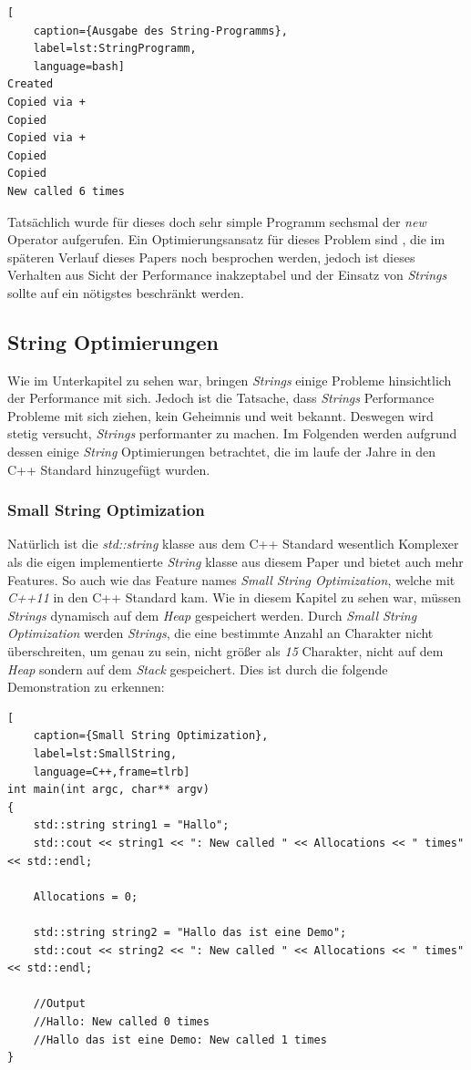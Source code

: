 \begin{lstlisting}[
    caption={Ausgabe des String-Programms},
    label=lst:StringProgramm,
    language=bash]
Created
Copied via +
Copied
Copied via +
Copied
Copied
New called 6 times
\end{lstlisting}

Tatsächlich wurde für dieses doch sehr simple Programm sechsmal der \emph{new} Operator
aufgerufen. Ein Optimierungsansatz für dieses Problem sind \emph{}, die im
späteren Verlauf dieses Papers noch besprochen werden, jedoch ist dieses Verhalten aus Sicht der
Performance inakzeptabel und der Einsatz von \emph{Strings} sollte auf ein nötigstes beschränkt
werden.

\subsection{String Optimierungen}
Wie im Unterkapitel \emph{} zu sehen war, bringen \emph{Strings}
einige Probleme hinsichtlich der Performance mit sich. Jedoch ist die Tatsache, dass
\emph{Strings} Performance Probleme mit sich ziehen, kein Geheimnis und weit bekannt. Deswegen
wird stetig versucht, \emph{Strings} performanter zu machen. Im Folgenden werden aufgrund dessen
einige \emph{String} Optimierungen betrachtet, die im laufe der Jahre in den C++ Standard
hinzugefügt wurden.
\newline
\subsubsection{Small String Optimization}
Natürlich ist die \emph{std::string} klasse aus dem C++ Standard wesentlich Komplexer als die
eigen implementierte \emph{String} klasse aus diesem Paper und bietet auch mehr Features. So auch
wie das Feature names \emph{Small String Optimization}, welche mit \emph{C++11} in den C++
Standard kam. Wie in diesem Kapitel zu sehen war, müssen \emph{Strings} dynamisch auf dem
\emph{Heap} gespeichert werden. Durch \emph{Small String Optimization} werden \emph{Strings}, die
eine bestimmte Anzahl an Charakter nicht überschreiten, um genau zu sein, nicht größer als \emph{15}
Charakter, nicht auf dem \emph{Heap} sondern auf dem \emph{Stack} gespeichert. Dies ist durch die
folgende Demonstration zu erkennen:

\begin{lstlisting}[
	caption={Small String Optimization},
	label=lst:SmallString,
	language=C++,frame=tlrb]
int main(int argc, char** argv)
{
	std::string string1 = "Hallo";
	std::cout << string1 << ": New called " << Allocations << " times" << std::endl;

	Allocations = 0;

	std::string string2 = "Hallo das ist eine Demo";
	std::cout << string2 << ": New called " << Allocations << " times" << std::endl;

	//Output
	//Hallo: New called 0 times
	//Hallo das ist eine Demo: New called 1 times
}
\end{lstlisting}
\newline
